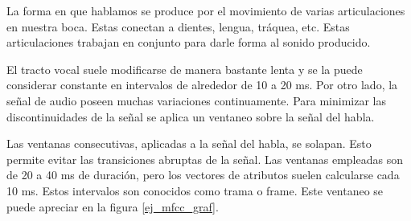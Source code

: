 La forma en que hablamos se produce por el movimiento de varias articulaciones en nuestra boca. Estas conectan a dientes, lengua, tráquea, etc. Estas articulaciones trabajan en conjunto para darle forma al sonido producido. 

El tracto vocal suele modificarse de manera bastante lenta y se la puede considerar constante en intervalos de alrededor de 10 a 20 ms. Por otro lado, la señal de audio poseen muchas variaciones continuamente. Para minimizar las discontinuidades de la señal se aplica un ventaneo sobre la señal del habla. 

Las ventanas consecutivas, aplicadas a la señal del habla, se solapan. Esto permite evitar las transiciones abruptas de la señal. Las ventanas empleadas son de 20 a 40 ms de duración, pero los vectores de atributos suelen calcularse cada 10 ms. Estos intervalos son conocidos como trama o frame. Este ventaneo se puede apreciar en la figura \ref{ej_mfcc_graf}.

\newcommand{\mfccvec}[3]%
{  
	\node[fill={rgb:black,1;white,2;white,3}, rounded corners, draw, inner sep=+0pt] at (#1,#2) {\tiny \begin{tabular}{c}
		Coef 1\\\hline
		Coef 2\\\hline
		Coef 3\\\hline
		...\\\hline
		Coef N\\
	\end{tabular}};
	\node at (#1, #2-1) {{\tiny #3}};
}

\newcommand{\mfccvecmax}[3]%
{  
	\node[fill={rgb:red,1;white,2;white,3}, rounded corners, draw, inner sep=+0pt] at (#1,#2) {\tiny \begin{tabular}{c}
		Max(T1.coef1, T2.coef1, ... , TM.coef1)\\\hline
		Max(T1.coef2, T2.coef2, ... , TM.coef2)\\\hline
		Max(T1.coef3, T2.coef3, ... , TM.coef3)\\\hline
		...\\\hline
		Max(T1.coefN, T2.coefN, ... , TM.coefN)\\
	\end{tabular}};
	\node at (#1, #2-1) {{\tiny #3}};
}

\newcommand{\intervalo}[2]%
{  
	\draw (#1,#2) -- (#1+0.8,#2);
	\draw (#1,#2-.1) -- (#1, #2+.1);
	\draw (#1+0.8,#2-.1) -- (#1+0.8, #2+.1);

	\draw (#1,#2) -- (#1+.1,#2+.05);
	\draw (#1,#2) -- (#1+.1,#2-.05);

	\draw (#1+0.8,#2) -- (#1+0.8-.1,#2+.05);
	\draw (#1+0.8,#2) -- (#1+0.8-.1,#2-.05);
}

